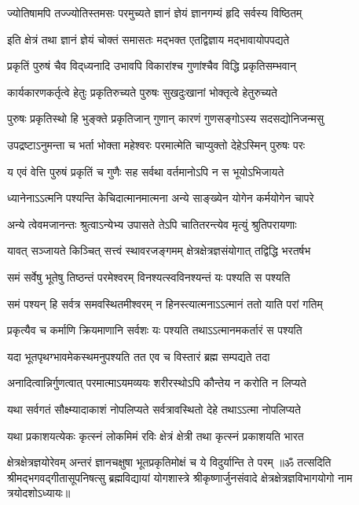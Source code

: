 \twolineshloka
{ज्योतिषामपि तज्ज्योतिस्तमसः परमुच्यते}
{ज्ञानं ज्ञेयं ज्ञानगम्यं हृदि सर्वस्य विष्ठितम्}%

\twolineshloka
{इति क्षेत्रं तथा ज्ञानं ज्ञेयं चोक्तं समासतः}
{मद्भक्त एतद्विज्ञाय मद्भावायोपपद्यते}%

\twolineshloka
{प्रकृतिं पुरुषं चैव विद्‌ध्यनादि उभावपि}
{विकारांश्च गुणांश्चैव विद्धि प्रकृतिसम्भवान्}%

\twolineshloka
{कार्यकारणकर्तृत्वे हेतुः प्रकृतिरुच्यते}
{पुरुषः सुखदुःखानां भोक्तृत्वे हेतुरुच्यते}%

\twolineshloka
{पुरुषः प्रकृतिस्थो हि भुङ्क्ते प्रकृतिजान् गुणान्}
{कारणं गुणसङ्गोऽस्य सदसद्योनिजन्मसु}%

\twolineshloka
{उपद्रष्टाऽनुमन्ता च भर्ता भोक्ता महेश्वरः}
{परमात्मेति चाप्युक्तो देहेऽस्मिन् पुरुषः परः}%

\twolineshloka
{य एवं वेत्ति पुरुषं प्रकृतिं च गुणैः सह}
{सर्वथा वर्तमानोऽपि न स भूयोऽभिजायते}%

\twolineshloka
{ध्यानेनाऽऽत्मनि पश्यन्ति केचिदात्मानमात्मना}
{अन्ये साङ्ख्येन योगेन कर्मयोगेन चापरे}%

\twolineshloka
{अन्ये त्वेवमजानन्तः श्रुत्वाऽन्येभ्य उपासते}
{तेऽपि चातितरन्त्येव मृत्युं श्रुतिपरायणाः}%

\twolineshloka
{यावत् सञ्जायते किञ्चित् सत्त्वं स्थावरजङ्गमम्}
{क्षेत्रक्षेत्रज्ञसंयोगात् तद्विद्धि भरतर्षभ}%

\twolineshloka
{समं सर्वेषु भूतेषु तिष्ठन्तं परमेश्वरम्}
{विनश्यत्स्वविनश्यन्तं यः पश्यति स पश्यति}%

\twolineshloka
{समं पश्यन् हि सर्वत्र समवस्थितमीश्वरम्}
{न हिनस्त्यात्मनाऽऽत्मानं ततो याति परां गतिम्}%

\twolineshloka
{प्रकृत्यैव च कर्माणि क्रियमाणानि सर्वशः}
{यः पश्यति तथाऽऽत्मानमकर्तारं स पश्यति}%

\twolineshloka
{यदा भूतपृथग्भावमेकस्थमनुपश्यति}
{तत एव च विस्तारं ब्रह्म सम्पद्यते तदा}%

\twolineshloka
{अनादित्वान्निर्गुणत्वात् परमात्माऽयमव्ययः}
{शरीरस्थोऽपि कौन्तेय न करोति न लिप्यते}%

\twolineshloka
{यथा सर्वगतं सौक्ष्म्यादाकाशं नोपलिप्यते}
{सर्वत्रावस्थितो देहे तथाऽऽत्मा नोपलिप्यते}%

\twolineshloka
{यथा प्रकाशयत्येकः कृत्स्नं लोकमिमं रविः}
{क्षेत्रं क्षेत्री तथा कृत्स्नं प्रकाशयति भारत}%

\twolineshloka
{क्षेत्रक्षेत्रज्ञयोरेवम् अन्तरं ज्ञानचक्षुषा}
{भूतप्रकृतिमोक्षं च ये विदुर्यान्ति ते परम्}%
{॥ॐ तत्सदिति श्रीमद्भगवद्गीतासूपनिषत्सु ब्रह्मविद्यायां योगशास्त्रे श्रीकृष्णार्जुनसंवादे क्षेत्रक्षेत्रज्ञविभागयोगो नाम त्रयोदशोऽध्यायः॥}
